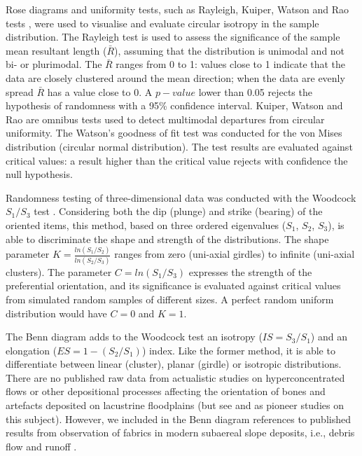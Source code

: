 \documentclass[preprint,authoryear,times]{elsarticle} %
\begin{document}
Rose diagrams and uniformity tests, such as Rayleigh, Kuiper, Watson and Rao tests \citep{Jammalamadaka2001}, were used to visualise and evaluate circular isotropy in the sample distribution. The Rayleigh test is used to assess the significance of the sample mean resultant length ($\bar{R}$), assuming that the distribution is unimodal and not bi- or plurimodal. The $\bar{R}$ ranges from 0 to 1: values close to 1 indicate that the data are closely clustered around the mean direction; when the data are evenly spread $\bar{R}$ has a value close to 0. A $p-value$ lower than 0.05 rejects the hypothesis of randomness with a 95\% confidence interval. Kuiper, Watson and Rao are omnibus tests used to detect multimodal departures from circular uniformity. The Watson's goodness of fit test was conducted for the von Mises distribution (circular normal distribution). The test results are evaluated against critical values: a result higher than the critical value rejects with confidence the null hypothesis.

Randomness testing of three-dimensional data was conducted with the Woodcock $S_1/S_3$ test \citep{Woodcock1983}. Considering both the dip (plunge) and strike (bearing) of the oriented items, this method, based on three ordered eigenvalues ($S_1$, $S_2$, $S_3$), is able to discriminate the shape and strength of the distributions. The shape parameter $K=\frac{ln(S_1/S_2)}{ln(S_2/S_3)}$ ranges from zero (uni-axial girdles) to infinite (uni-axial clusters). The parameter $C=ln(S_1/S_3)$ expresses the strength of the preferential orientation, and its significance is evaluated against critical values from simulated random samples of different sizes. A perfect random uniform distribution would have $C=0$ and $K=1$.

The Benn \citep{Benn1994} diagram adds to the Woodcock test an isotropy ($IS=S_3/S_1$) and an elongation ($ES=1-(S_2/S_1)$) index. Like the former method, it is able to differentiate between linear (cluster), planar (girdle) or isotropic distributions. There are no published raw data from actualistic studies on hyperconcentrated flows or other depositional processes affecting the orientation of bones and artefacts deposited on lacustrine floodplains (but see \cite{Morton2004} and \cite{Cobo-Sanchez2014} as pioneer studies on this subject). However, we included in the Benn diagram references to published results from observation of fabrics in modern subaereal slope deposits, i.e., debris flow and runoff \citep{Bertran1997,Lenoble2004}.
\end{document}
